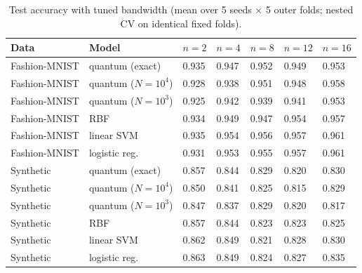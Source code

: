 \begin{table}[t]
\centering
\caption{Test accuracy with tuned bandwidth (mean over 5 seeds $\times$ 5 outer folds; nested CV on identical fixed folds).}
\label{tab:tuned}
\setlength{\tabcolsep}{3pt}
\begin{tabular}{lllllll}
\toprule
Data & Model & $n=2$ & $n=4$ & $n=8$ & $n=12$ & $n=16$ \\
\midrule
Fashion-MNIST & quantum (exact) & 0.935 & 0.947 & 0.952 & 0.949 & 0.953 \\
Fashion-MNIST & quantum ($N=10^4$) & 0.928 & 0.938 & 0.951 & 0.948 & 0.958 \\
Fashion-MNIST & quantum ($N=10^3$) & 0.925 & 0.942 & 0.939 & 0.941 & 0.953 \\
Fashion-MNIST & RBF & 0.934 & 0.949 & 0.947 & 0.954 & 0.957 \\
Fashion-MNIST & linear SVM & 0.935 & 0.954 & 0.956 & 0.957 & 0.961 \\
Fashion-MNIST & logistic reg. & 0.931 & 0.953 & 0.955 & 0.957 & 0.961 \\
Synthetic & quantum (exact) & 0.857 & 0.844 & 0.829 & 0.820 & 0.830 \\
Synthetic & quantum ($N=10^4$) & 0.850 & 0.841 & 0.825 & 0.815 & 0.829 \\
Synthetic & quantum ($N=10^3$) & 0.847 & 0.837 & 0.829 & 0.820 & 0.817 \\
Synthetic & RBF & 0.857 & 0.844 & 0.823 & 0.823 & 0.825 \\
Synthetic & linear SVM & 0.862 & 0.849 & 0.821 & 0.828 & 0.830 \\
Synthetic & logistic reg. & 0.863 & 0.849 & 0.824 & 0.827 & 0.835 \\
\bottomrule
\end{tabular}
\end{table}
